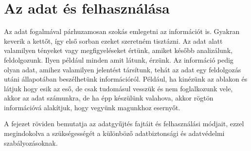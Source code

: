 \chapter{Az adat és felhasználása} \label{az-adat-es-felhasznalasa}

Az adat fogalmával párhuzamosan szokás emlegetni az információt is. Gyakran keverik a kettőt, így első sorban ezeket szeretném tisztázni. Az adat alatt valamilyen tényeket vagy megfigyeléseket értünk, amiket később analizálunk, feldolgozunk. Ilyen például minden amit látunk, érzünk. Az információ pedig olyan adat, amihez valamilyen jelentést társítunk, tehát az adat egy feldolgozás utáni állapotában beszélhetünk információról. Például, ha kinézünk az ablakon és látjuk hogy esik az eső, de csak tudomásul vesszük és nem foglalkozunk vele, akkor az adat számunkra, de ha épp készülünk valahova, akkor rögtön információvá alakítjuk, hogy vegyünk magunkhoz esernyőt.

A fejezet röviden bemutatja az adatgyűjtés fajtáit és felhasználási módjait, ezzel megindokolva a szükségességét a különböző adatbiztonsági és adatvédelmi szabályozásoknak.





